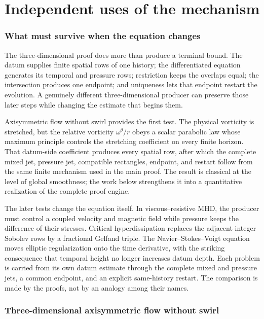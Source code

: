 \part{Independent uses of the mechanism}

\section{What must survive when the equation changes}

The three-dimensional proof does more than produce a terminal bound.  The
datum supplies finite spatial rows of one history; the differentiated
equation generates its temporal and pressure rows; restriction keeps the
overlaps equal; the intersection produces one endpoint; and uniqueness lets
that endpoint restart the evolution.  A genuinely different
three-dimensional producer can preserve those later steps while changing the
estimate that begins them.

Axisymmetric flow without swirl provides the first test.  The physical
vorticity is stretched, but the relative vorticity
\(\omega^\theta/r\) obeys a scalar parabolic law whose maximum principle
controls the stretching coefficient on every finite horizon.  That
datum-side coefficient produces every spatial row, after which the complete
mixed jet, pressure jet, compatible rectangles, endpoint, and restart follow
from the same finite mechanism used in the main proof.  The result is
classical at the level of global smoothness; the work below strengthens it
into a quantitative realization of the complete proof engine.

The later tests change the equation itself.  In viscous--resistive MHD, the
producer must control a coupled velocity and magnetic field while pressure
keeps the difference of their stresses.  Critical hyperdissipation replaces
the adjacent integer Sobolev rows by a fractional Gelfand triple.  The
Navier--Stokes--Voigt equation moves elliptic regularization onto the time
derivative, with the striking consequence that temporal height no longer
increases datum depth.  Each problem is carried from its own datum estimate
through the complete mixed and pressure jets, a common endpoint, and an
explicit same-history restart.  The comparison is made by the proofs, not by
an analogy among their names.

\section{Three-dimensional axisymmetric flow without swirl}
\label{sec:axisymmetric-application}

